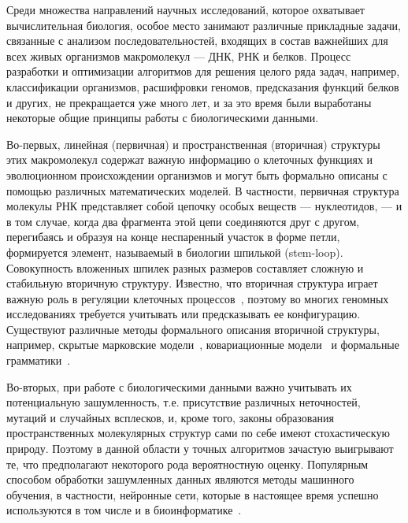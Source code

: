 Среди множества направлений научных исследований, которое охватывает вычислительная биология, особое место занимают различные прикладные задачи, связанные с анализом последовательностей, входящих в состав важнейших для всех живых организмов макромолекул --- ДНК, РНК и белков. Процесс разработки и оптимизации алгоритмов для решения целого ряда задач, например, классификации организмов, расшифровки геномов, предсказания функций белков и других, не прекращается уже много лет, и за это время были выработаны некоторые общие принципы работы с биологическими данными.

Во-первых, линейная (первичная) и пространственная (вторичная) структуры этих макромолекул содержат важную информацию о клеточных функциях и эволюционном происхождении организмов и могут быть формально описаны с помощью различных математических моделей. В частности, первичная структура молекулы РНК представляет собой цепочку особых веществ --- нуклеотидов, --- и в том случае, когда два фрагмента этой цепи соединяются друг с другом, перегибаясь и образуя на конце неспаренный участок в форме петли, формируется элемент, называемый в биологии шпилькой (stem-loop). Совокупность вложенных шпилек разных размеров составляет сложную и стабильную вторичную структуру. Известно, что вторичная структура играет важную роль в регуляции клеточных процессов~\cite{vandivier2016conservation}, поэтому во многих геномных исследованиях требуется учитывать или предсказывать ее конфигурацию. Существуют различные методы формального описания вторичной структуры, например, скрытые марковские модели~\cite{yoon2004hmm}, ковариационные модели~\cite{sippl1999biological} и формальные грамматики~\cite{dowell2004evaluation,knudsen1999rna,rivas2000language}.

Во-вторых, при работе с биологическими данными важно учитывать их потенциальную зашумленность, т.е. присутствие различных неточностей, мутаций и случайных всплесков, и, кроме того, законы образования пространственных молекулярных структур сами по себе имеют стохастическую природу. Поэтому в данной области у точных алгоритмов зачастую выигрывают те, что предполагают некоторого рода вероятностную оценку. Популярным способом обработки зашумленных данных являются методы машинного обучения, в частности, нейронные сети, которые в настоящее время успешно используются в том числе и в биоинформатике~\cite{higashi2009bacteria,sherman2017humidor}.

